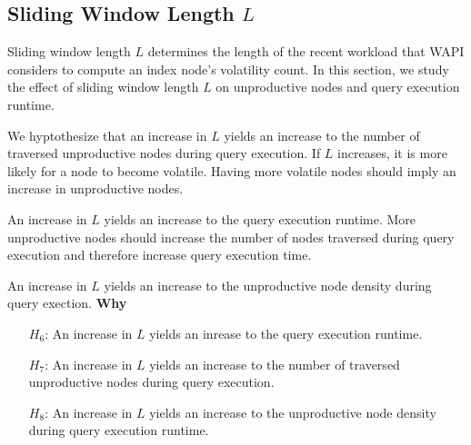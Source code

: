 \documentclass[abstracton,12pt]{scrartcl}
\theoremstyle{definition}
\begin{document}
\subsection{Sliding Window Length $L$}

Sliding window length $L$ determines the length of the recent workload that WAPI
considers to compute an index node's volatility count. In this section, we study
the effect of sliding window length $L$ on unproductive nodes and query
execution runtime.

We hyptothesize that an increase in $L$ yields an increase to the number of
traversed unproductive nodes during query execution. If $L$ increases, it is
more likely for a node to become volatile. Having more volatile nodes should
imply an increase in unproductive nodes.

An increase in $L$ yields an increase to the query execution runtime. More
unproductive nodes should increase the number of nodes traversed
during query execution and therefore increase query execution time.

An increase in $L$ yields an increase to the unproductive node density during
query exection. \textbf{Why}

\begin{shaded}
  \begin{itemize}
  \item[$H_6$:] An increase in $L$ yields an inrease to the query execution runtime. 
  \item[$H_7$:] An increase in $L$ yields an increase to the number of
    traversed unproductive nodes during query execution.
  \item[$H_8$:] An increase in $L$ yields an increase to the unproductive node
    density during query execution runtime.
  \end{itemize}
\end{shaded}
\end{document}
